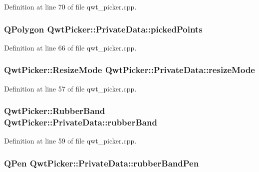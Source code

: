 Definition at line 70 of file qwt\-\_\-picker.\-cpp.

\hypertarget{class_qwt_picker_1_1_private_data_a43ab0eb4137aafcbd1f6c7c139c5ddea}{
\subsubsection[{picked\-Points}]{\setlength{\rightskip}{0pt plus 5cm}Q\-Polygon Qwt\-Picker\-::\-Private\-Data\-::picked\-Points}}\label{class_qwt_picker_1_1_private_data_a43ab0eb4137aafcbd1f6c7c139c5ddea}


Definition at line 66 of file qwt\-\_\-picker.\-cpp.

\hypertarget{class_qwt_picker_1_1_private_data_a300c51c55b58d203e3fd2e4eff48e9dc}{
\subsubsection[{resize\-Mode}]{\setlength{\rightskip}{0pt plus 5cm}Qwt\-Picker\-::\-Resize\-Mode Qwt\-Picker\-::\-Private\-Data\-::resize\-Mode}}\label{class_qwt_picker_1_1_private_data_a300c51c55b58d203e3fd2e4eff48e9dc}


Definition at line 57 of file qwt\-\_\-picker.\-cpp.

\hypertarget{class_qwt_picker_1_1_private_data_ab22bf69d05d50292b7f831617215f177}{
\subsubsection[{rubber\-Band}]{\setlength{\rightskip}{0pt plus 5cm}Qwt\-Picker\-::\-Rubber\-Band Qwt\-Picker\-::\-Private\-Data\-::rubber\-Band}}\label{class_qwt_picker_1_1_private_data_ab22bf69d05d50292b7f831617215f177}


Definition at line 59 of file qwt\-\_\-picker.\-cpp.

\hypertarget{class_qwt_picker_1_1_private_data_ae1102efd6269f5381e00af1bd551c592}{
\subsubsection[{rubber\-Band\-Pen}]{\setlength{\rightskip}{0pt plus 5cm}Q\-Pen Qwt\-Picker\-::\-Private\-Data\-::rubber\-Band\-Pen}}\label{class_qwt_picker_1_1_private_data_ae1102efd6269f5381e00af1bd551c592}


